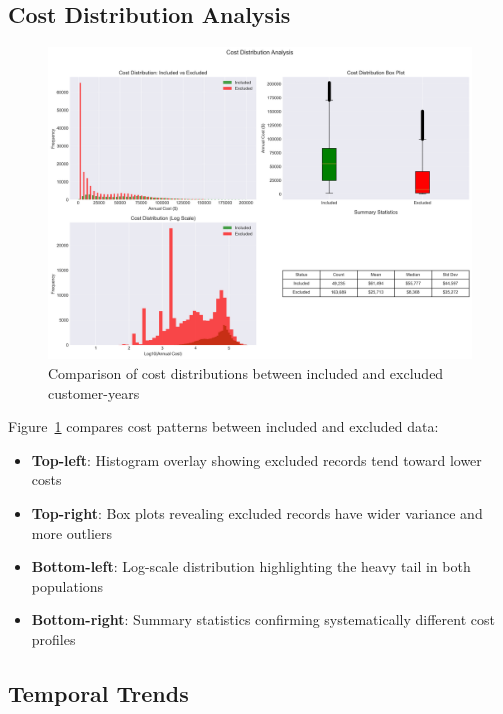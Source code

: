 \subsection{Cost Distribution Analysis}

\begin{figure}[h]
    \centering
    \includegraphics[width=\textwidth]{figures/cost_distributions.png}
    \caption{Comparison of cost distributions between included and excluded customer-years}
    \label{fig:cost_distributions}
\end{figure}

Figure~\ref{fig:cost_distributions} compares cost patterns between included and excluded data:
\begin{itemize}
    \item \textbf{Top-left}: Histogram overlay showing excluded records tend toward lower costs
    \item \textbf{Top-right}: Box plots revealing excluded records have wider variance and more outliers
    \item \textbf{Bottom-left}: Log-scale distribution highlighting the heavy tail in both populations
    \item \textbf{Bottom-right}: Summary statistics confirming systematically different cost profiles
\end{itemize}

\subsection{Temporal Trends}


